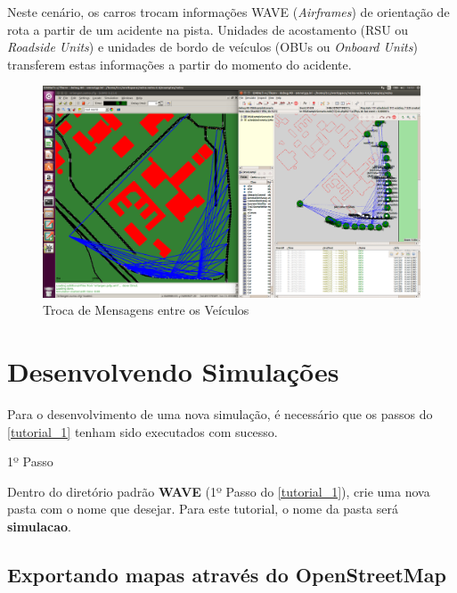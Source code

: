 \documentclass[
12pt,				%
openright,			%
oneside,			%
a4paper,			%
brazil,				%
]{abntex2}
\begin{document}
{\begin{anexosenv}
                \par Neste cenário, os carros trocam informações WAVE (\textit{Airframes}) de orientação de rota a partir de um acidente na pista. Unidades de acostamento (RSU ou \textit{Roadside Units}) e unidades de bordo de veículos (OBUs ou \textit{Onboard Units}) transferem estas informações a partir do momento do acidente.
		            
                \begin{figure} [H]
	                \centering
	                \includegraphics[scale=.35]{figuras/aneB/69WAVE}
	                \caption{\label{fig_69}Troca de Mensagens entre os Veículos}
                \end{figure}

		\chapter{\label{tutorial_2}Desenvolvendo Simulações}
		    
		    \par Para o desenvolvimento de uma nova simulação, é necessário que os passos do \autoref{tutorial_1} tenham sido executados com sucesso. %
		    
        	\begin{description}
                \item[1º Passo]
            \end{description}
            \par Dentro do diretório padrão \textbf{WAVE} (1º Passo do \autoref{tutorial_1}), crie uma nova pasta com o nome que desejar. Para este tutorial, o nome da pasta será \textbf{simulacao}. %
            
        	\section{Exportando mapas através do OpenStreetMap}


\end{anexosenv}}
\end{document}

